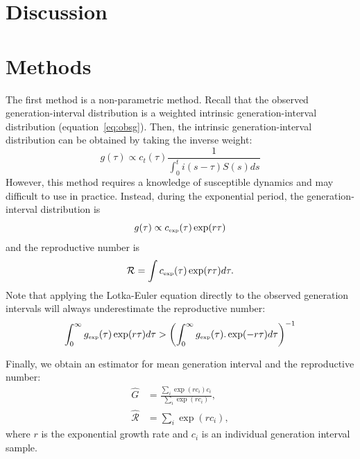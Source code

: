 \documentclass[12pt]{article}
\newcommand{\RR}{\ensuremath{{\mathcal R}}}
\newcommand{\tsub}[2]{#1_{{\textrm{\tiny #2}}}}
\begin{document}
\section{Discussion}

\section{Methods}

The first method is a non-parametric method.
Recall that the observed generation-interval distribution is a weighted intrinsic generation-interval distribution (equation~\ref{eq:obsg}). 
Then, the intrinsic generation-interval distribution can be obtained by taking the inverse weight:
\begin{equation}
g(\tau) \propto c_t(\tau) \frac{1}{\int_{0}^t i(s-\tau) S(s) ds}
\end{equation}
However, this method requires a knowledge of susceptible dynamics and may difficult to use in practice.
Instead, during the exponential period, the generation-interval distribution is
\begin{equation}
g(\tau) \propto \tsub{c}{exp}(\tau) \exp(r\tau)
\end{equation}
and the reproductive number is
\begin{equation}
\RR = \int \tsub{c}{exp}(\tau) \exp(r\tau) d\tau.
\end{equation}
Note that applying the Lotka-Euler equation directly to the observed generation intervals will always underestimate the reproductive number:
\begin{equation}
\int_0^\infty \tsub{g}{exp}(\tau) \exp(r\tau) d\tau > \left(\int_0^\infty \tsub{g}{exp}(\tau). \exp(-r\tau) d\tau\right)^{-1}
\end{equation}

Finally, we obtain an estimator for mean generation interval and the reproductive number:
\begin{equation}
\begin{aligned}
\hat{G} &= \frac{\sum_{i} \exp(r c_i) c_i}{\sum_{i} \exp(r c_i)},\\
\hat{\RR} &= \sum_{i} \exp(r c_i),
\end{aligned}
\end{equation}
where $r$ is the exponential growth rate and $c_i$ is an individual generation interval sample.


\end{document}
